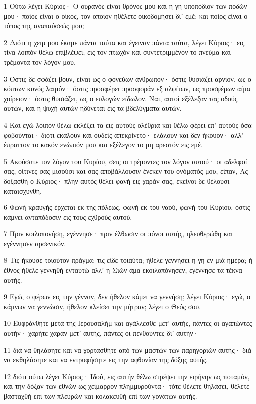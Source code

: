 \par 1 Ούτω λέγει Κύριος· Ο ουρανός είναι θρόνος μου και η γη υποπόδιον των ποδών μου· ποίος είναι ο οίκος, τον οποίον ηθέλετε οικοδομήσει δι' εμέ; και ποίος είναι ο τόπος της αναπαύσεώς μου;
\par 2 Διότι η χειρ μου έκαμε πάντα ταύτα και έγειναν πάντα ταύτα, λέγει Κύριος· εις τίνα λοιπόν θέλω επιβλέψει; εις τον πτωχόν και συντετριμμένον το πνεύμα και τρέμοντα τον λόγον μου.
\par 3 Όστις δε σφάζει βουν, είναι ως ο φονεύων άνθρωπον· όστις θυσιάζει αρνίον, ως ο κόπτων κυνός λαιμόν· όστις προσφέρει προσφοράν εξ αλφίτων, ως προσφέρων αίμα χοίρειον· όστις θυσιάζει, ως ο ευλογών είδωλον. Ναι, αυτοί εξέλεξαν τας οδούς αυτών, και η ψυχή αυτών ηδύνεται εις τα βδελύγματα αυτών.
\par 4 Και εγώ λοιπόν θέλω εκλέξει τα εις αυτούς ολέθρια και θέλω φέρει επ' αυτούς όσα φοβούνται· διότι εκάλουν και ουδείς απεκρίνετο· ελάλουν και δεν ήκουον· αλλ' έπραττον το κακόν ενώπιόν μου και εξέλεγον το μη αρεστόν εις εμέ.
\par 5 Ακούσατε τον λόγον του Κυρίου, σεις οι τρέμοντες τον λόγον αυτού· οι αδελφοί σας, οίτινες σας μισούσι και σας αποβάλλουσιν ένεκεν του ονόματός μου, είπαν, Ας δοξασθή ο Κύριος· πλην αυτός θέλει φανή εις χαράν σας, εκείνοι δε θέλουσι καταισχυνθή.
\par 6 Φωνή κραυγής έρχεται εκ της πόλεως, φωνή εκ του ναού, φωνή του Κυρίου, όστις κάμνει ανταπόδοσιν εις τους εχθρούς αυτού.
\par 7 Πριν κοιλοπονήση, εγέννησε· πριν έλθωσιν οι πόνοι αυτής, ηλευθερώθη και εγέννησεν αρσενικόν.
\par 8 Τις ήκουσε τοιούτον πράγμα; τις είδε τοιαύτα; ήθελε γεννήσει η γη εν μιά ημέρα; ή έθνος ήθελε γεννηθή ενταυτώ αλλ' η Σιών άμα εκοιλοπόνησεν, εγέννησε τα τέκνα αυτής.
\par 9 Εγώ, ο φέρων εις την γένναν, δεν ήθελον κάμει να γεννήση; λέγει Κύριος· εγώ, ο κάμνων να γεννώσιν, ήθελον κλείσει την μήτραν; λέγει ο Θεός σου.
\par 10 Ευφράνθητε μετά της Ιερουσαλήμ και αγάλλεσθε μετ' αυτής, πάντες οι αγαπώντες αυτήν· χαρήτε χαράν μετ' αυτής, πάντες οι πενθούντες δι' αυτήν·
\par 11 διά να θηλάσητε και να χορτασθήτε από των μαστών των παρηγοριών αυτής· διά να εκθηλάσητε και να εντρυφήσητε εις την αφθονίαν της δόξης αυτής.
\par 12 διότι ούτω λέγει Κύριος· Ιδού, εις αυτήν θέλω στρέψει την ειρήνην ως ποταμόν, και την δόξαν των εθνών ως χείμαρρον πλημμυρούντα· τότε θέλετε θηλάσει, θέλετε βασταχθή επί των πλευρών και κολακευθή επί των γονάτων αυτής.

